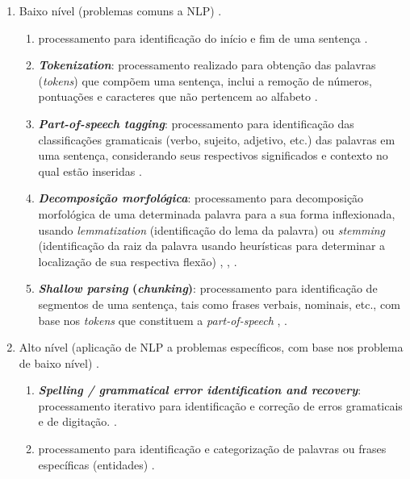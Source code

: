 \documentclass[
	12pt,				%
	oneside,			%
	a4paper,			%
	english,			%
	brazil				%
	]{abntex2ppgsi}
\begin{document}
\begin{enumerate}
\item Baixo nível (problemas comuns a NLP) \cite{nadkarni2011natural}. 
\begin{enumerate}
\item {} processamento para identificação do início e fim de uma sentença \cite{nadkarni2011natural}. 
\item \textit{\textbf{Tokenization}}: processamento realizado para obtenção das palavras  (\textit{tokens}) que compõem uma sentença, inclui a remoção de números, pontuações e caracteres que não pertencem ao alfabeto \cite{Setiawan2017}.
\item \textbf{\textit{Part-of-speech tagging}}: processamento para identificação das classificações gramaticais (verbo, sujeito, adjetivo, etc.) das palavras em uma  sentença, considerando seus respectivos significados e contexto no qual estão inseridas \cite{roy2017understanding}.
\item \textbf{\textit{Decomposição morfológica}}: processamento para decomposição morfológica de uma determinada palavra para a sua forma inflexionada, usando \textit{lemmatization} (identificação do lema da palavra) ou \textit{stemming} (identificação da raiz da palavra usando heurísticas para determinar a localização de sua respectiva flexão) \cite{Setiawan2017}, \cite{nadkarni2011natural}, \cite{Korenius}.
\item \textbf{\textit{Shallow parsing} (\textit{chunking})}: processamento para identificação de segmentos de uma sentença, tais como frases verbais, nominais, etc., com base nos \textit{tokens} que constituem a \textit{part-of-speech} \cite{collobert2011natural}, \cite{nadkarni2011natural}. 
\end{enumerate}
\item Alto nível (aplicação de NLP a problemas específicos, com base nos problema de baixo nível) \cite{nadkarni2011natural}.
\begin{enumerate}
\item \textbf{\textit{Spelling / grammatical error identification and recovery}}: processamento iterativo para identificação e correção de erros gramaticais e de digitação. \cite{nadkarni2011natural}.
\item{} processamento para identificação e categorização de palavras ou frases específicas (entidades) \cite{nadkarni2011natural}.

\end{enumerate}
\end{enumerate}
\end{document}
